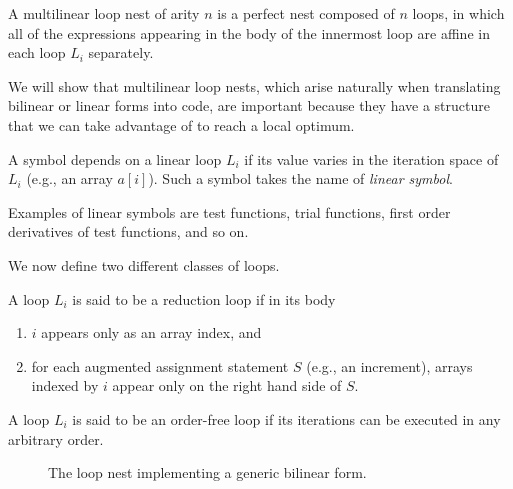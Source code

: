 \begin{Def}
\label{def:multi-linear-loop}
A multilinear loop nest of arity $n$ is a perfect nest composed of $n$ loops, in which all of the expressions appearing in the body of the innermost loop are affine in each loop $L_i$ separately.
\end{Def}

We will show that multilinear loop nests, which arise naturally when translating bilinear or linear forms into code, are important because they have a structure that we can take advantage of to reach a local optimum.

\begin{Def}
\label{def:linear-symbol}
A symbol depends on a linear loop $L_i$ if its value varies in the iteration space of $L_i$ (e.g., an array $a[i]$). Such a symbol takes the name of {\em linear symbol}.
\end{Def}

Examples of linear symbols are test functions, trial functions, first order derivatives of test functions, and so on.

We now define two different classes of loops. 

\begin{Def}
\label{def:i-loop}
A loop $L_i$ is said to be a reduction loop if in its body
\begin{enumerate}
\item $i$ appears only as an array index, and
\item for each augmented assignment statement $S$ (e.g., an increment), arrays indexed by $i$ appear only on the right hand side of $S$.
\end{enumerate}
\end{Def}

\begin{Def}
\label{def:e-loop}
A loop $L_i$ is said to be an order-free loop if its iterations can be executed in any arbitrary order. 
\end{Def}

\begin{figure}\begin{CenteredBox}

\end{CenteredBox}\caption{The loop nest implementing a generic bilinear form.}\label{code:loopnest}\end{figure}

